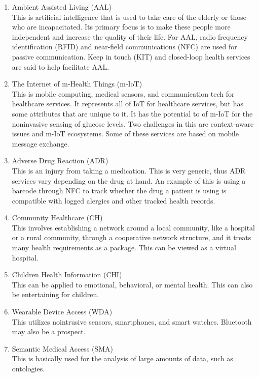 \documentclass{article}
\begin{document}
\begin{enumerate}
\item Ambient Assisted Living (AAL)
\\ This is artificial intelligence that is used to take care of the elderly or those who 
are incapacitated. Its primary focus is to make these people more independent and 
increase the quality of their life. For AAL, radio frequency identification (RFID) and
near-field communications (NFC) are used for passive communication. Keep in touch (KIT)
and closed-loop health services are said to help facilitate AAL. 

\item The Internet of m-Health Things (m-IoT)
\\ This is mobile computing, medical sensors, and communication tech for healthcare services. 
It represents all of IoT for healthcare services, but has some attributes that are unique
to it. It has the potential to of m-IoT for the noninvasive sensing of glucose levels. 
Two challenges in this are context-aware issues and m-IoT ecosystems. Some of these services
are based on mobile message exchange.

\item Adverse Drug Reaction (ADR)
\\ This is an injury from taking a medication. This is very generic, thus ADR services vary
depending on the drug at hand. An example of this is using a barcode through NFC to 
track whether the drug a patient is using is compatible with logged alergies and other
tracked health records.

\item Community Healthcare (CH)
\\ This involves establishing a network around a local community, like a hospital or a rural
community, through a cooperative network structure, and it treats many health requirements
as a package. This can be viewed as a virtual hospital. 

\item Children Health Information (CHI)
\\ This can be applied to emotional, behavioral, or mental health. This can also be 
entertaining for children.

\item Wearable Device Access (WDA)
\\ This utilizes nointrusive sensors, smartphones, and smart watches. Bluetooth may also be
a prospect.

\item Semantic Medical Access (SMA)
\\ This is basically used for the analysis of large amounts of data, such as ontologies.


\end{enumerate}
\end{document}
